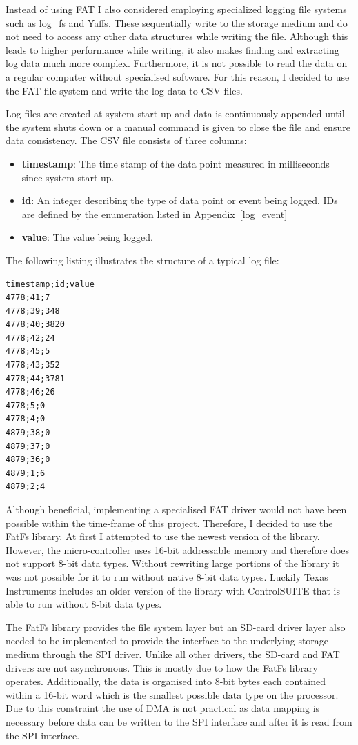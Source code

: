 Instead of using FAT I also considered employing specialized logging file systems such as log\_fs\cite{log_fs} and Yaffs\cite{yaffs}. These sequentially write to the storage medium and do not need to access any other data structures while writing the file. Although this leads to higher performance while writing, it also makes finding and extracting log data much more complex. Furthermore, it is not possible to read the data on a regular computer without specialised software. For this reason, I decided to use the FAT file system and write the log data to CSV files.

Log files are created at system start-up and data is continuously appended until the system shuts down or a manual command is given to close the file and ensure data consistency. The CSV file consists of three columns:

\begin{itemize}
    \item \textbf{timestamp}: The time stamp of the data point measured in milliseconds since system start-up.
    \item \textbf{id}: An integer describing the type of data point or event being logged. IDs are defined by the enumeration listed in Appendix~\ref{log_event}
    \item \textbf{value}: The value being logged.
\end{itemize}

The following listing illustrates the structure of a typical log file:

\begin{verbatim}
timestamp;id;value
4778;41;7
4778;39;348
4778;40;3820
4778;42;24
4778;45;5
4778;43;352
4778;44;3781
4778;46;26
4778;5;0
4778;4;0
4879;38;0
4879;37;0
4879;36;0
4879;1;6
4879;2;4
\end{verbatim}

Although beneficial, implementing a specialised FAT driver would not have been possible within the time-frame of this project. Therefore, I decided to use the FatFs\cite{fatfs} library. At first I attempted to use the newest version of the library. However, the micro-controller uses 16-bit addressable memory and therefore does not support 8-bit data types. Without rewriting large portions of the library it was not possible for it to run without native 8-bit data types. Luckily Texas Instruments includes an older version of the library with ControlSUITE\cite{controlsuite} that is able to run without 8-bit data types.

The FatFs library provides the file system layer but an SD-card driver layer also needed to be implemented to provide the interface to the underlying storage medium through the SPI driver. Unlike all other drivers, the SD-card and FAT drivers are not asynchronous. This is mostly due to how the FatFs library operates. Additionally, the data is organised into 8-bit bytes each contained within a 16-bit word which is the smallest possible data type on the processor. Due to this constraint the use of DMA is not practical as data mapping is necessary before data can be written to the SPI interface and after it is read from the SPI interface.

